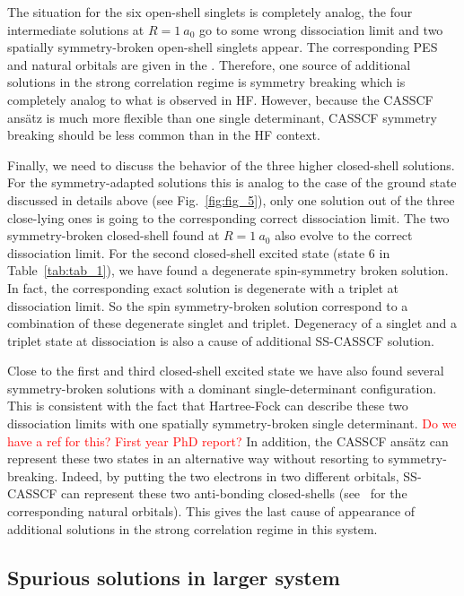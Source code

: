 \documentclass[aps,prb,reprint,showkeys,superscriptaddress]{revtex4-1}
\newcommand{\todo}[1]{\textcolor{red}{#1}}
\begin{document}
The situation for the six open-shell singlets is completely analog, \ie the four intermediate solutions at $R=1~a_0$ go to some wrong dissociation limit and two spatially symmetry-broken open-shell singlets appear.
The corresponding PES and natural orbitals are given in the \SupInf.
Therefore, one source of additional solutions in the strong correlation regime is symmetry breaking which is completely analog to what is observed in HF.
However, because the CASSCF ans\"atz is much more flexible than one single determinant, CASSCF symmetry breaking should be less common than in the HF context.

Finally, we need to discuss the behavior of the three higher closed-shell solutions.
For the symmetry-adapted solutions this is analog to the case of the ground state discussed in details above (see Fig.~\ref{fig:fig_5}), \ie only one solution out of the three close-lying ones is going to the corresponding correct dissociation limit.
The two symmetry-broken closed-shell found at $R=1~a_0$ also evolve to the correct dissociation limit.
For the second closed-shell excited state (state 6 in Table~\ref{tab:tab_1}), we have found a degenerate spin-symmetry broken solution.
In fact, the corresponding exact solution is degenerate with a triplet at dissociation limit.
So the spin symmetry-broken solution correspond to a combination of these degenerate singlet and triplet.
Degeneracy of a singlet and a triplet state at dissociation is also a cause of additional SS-CASSCF solution.

Close to the first and third closed-shell excited state we have also found several symmetry-broken solutions with a dominant single-determinant configuration.
This is consistent with the fact that Hartree-Fock can describe these two dissociation limits with one spatially symmetry-broken single determinant. \todo{Do we have a ref for this? First year PhD report?}
In addition, the CASSCF ans\"atz can represent these two states in an alternative way without resorting to symmetry-breaking.
Indeed, by putting the two electrons in two different orbitals, SS-CASSCF can represent these two anti-bonding closed-shells (see \SupInf~for the corresponding natural orbitals).
This gives the last cause of appearance of additional solutions in the strong correlation regime in this system.

\subsection{Spurious solutions in larger system}
\label{sec:largersystem}
\end{document}
